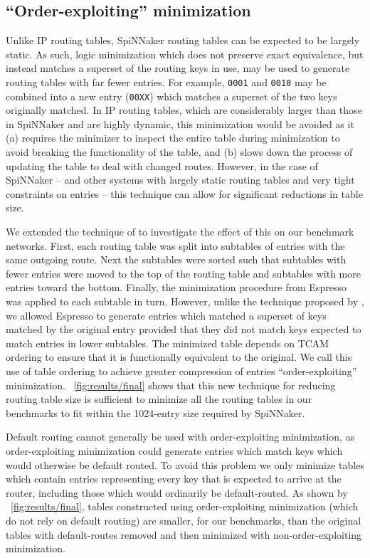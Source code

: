 \documentclass[conference]{IEEEtran}
\newcommand{\mytt}[1]{\texttt{\footnotesize#1}}
\begin{document}
\subsection{``Order-exploiting'' minimization}

Unlike IP routing tables, SpiNNaker routing tables can be expected to be largely static.
As such, logic minimization which does not preserve exact equivalence, but instead matches a superset of the routing keys in use, may be used to generate routing tables with far fewer entries.
For example, \mytt{0001} and \mytt{0010} may be combined into a new entry (\mytt{00XX}) which matches a superset of the two keys originally matched.
In IP routing tables, which are considerably larger than those in SpiNNaker and are highly dynamic, this minimization would be avoided as it (a) requires the minimizer to inspect the entire table during minimization to avoid breaking the functionality of the table,
and (b) slows down the process of updating the table to deal with changed routes.
However, in the case of SpiNNaker -- and other systems with largely static routing tables and very tight constraints on entries -- this technique can allow for significant reductions in table size.

We extended the technique of \textcite{Liu2002} to investigate the effect of this on our benchmark networks.
First, each routing table was split into subtables of entries with the same outgoing route.
Next the subtables were sorted such that subtables with fewer entries were moved to the top of the routing table and subtables with more entries toward the bottom.
Finally, the minimization procedure from Espresso was applied to each subtable in turn.
However, unlike the technique proposed by \textcite{Liu2002}, we allowed Espresso to generate entries which matched a superset of keys matched by the original entry provided that they did not match keys expected to match entries in lower subtables.
The minimized table depends on TCAM ordering to ensure that it is functionally equivalent to the original.
We call this use of table ordering to achieve greater compression of entries ``order-exploiting'' minimization.
\figurename~\ref{fig:results/final} shows that this new technique for reducing routing table size is sufficient to minimize all the routing tables in our benchmarks to fit within the 1024-entry size required by SpiNNaker.

Default routing cannot generally be used with order-exploiting minimization, as order-exploiting minimization could generate entries which match keys which would otherwise be default routed.
To avoid this problem we only minimize tables which contain entries representing every key that is expected to arrive at the router, including those which would ordinarily be default-routed.
As shown by \figurename~\ref{fig:results/final}, tables constructed using order-exploiting minimization (which do not rely on default routing) are smaller, for our benchmarks, than the original tables with default-routes removed and then minimized with non-order-exploiting minimization.
\end{document}
